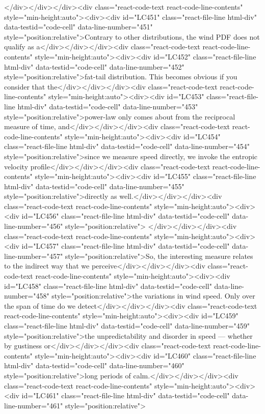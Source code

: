 {{{</div></div></div><div class="react-code-text react-code-line-contents" style="min-height:auto"><div><div id="LC451" class="react-file-line html-div" data-testid="code-cell" data-line-number="451" style="position:relative">Contrary to other distributions, the wind PDF does not qualify as a</div></div></div><div class="react-code-text react-code-line-contents" style="min-height:auto"><div><div id="LC452" class="react-file-line html-div" data-testid="code-cell" data-line-number="452" style="position:relative">fat-tail distribution. This becomes obvious if you consider that the</div></div></div><div class="react-code-text react-code-line-contents" style="min-height:auto"><div><div id="LC453" class="react-file-line html-div" data-testid="code-cell" data-line-number="453" style="position:relative">power-law only comes about from the reciprocal measure of time, and</div></div></div><div class="react-code-text react-code-line-contents" style="min-height:auto"><div><div id="LC454" class="react-file-line html-div" data-testid="code-cell" data-line-number="454" style="position:relative">since we measure speed directly, we invoke the entropic velocity profile</div></div></div><div class="react-code-text react-code-line-contents" style="min-height:auto"><div><div id="LC455" class="react-file-line html-div" data-testid="code-cell" data-line-number="455" style="position:relative">directly as well.</div></div></div><div class="react-code-text react-code-line-contents" style="min-height:auto"><div><div id="LC456" class="react-file-line html-div" data-testid="code-cell" data-line-number="456" style="position:relative">
</div></div></div><div class="react-code-text react-code-line-contents" style="min-height:auto"><div><div id="LC457" class="react-file-line html-div" data-testid="code-cell" data-line-number="457" style="position:relative">So, the interesting measure relates to the indirect way that we perceive</div></div></div><div class="react-code-text react-code-line-contents" style="min-height:auto"><div><div id="LC458" class="react-file-line html-div" data-testid="code-cell" data-line-number="458" style="position:relative">the variations in wind speed. Only over the span of time do we detect</div></div></div><div class="react-code-text react-code-line-contents" style="min-height:auto"><div><div id="LC459" class="react-file-line html-div" data-testid="code-cell" data-line-number="459" style="position:relative">the unpredictability and disorder in speed --- whether by gustiness or</div></div></div><div class="react-code-text react-code-line-contents" style="min-height:auto"><div><div id="LC460" class="react-file-line html-div" data-testid="code-cell" data-line-number="460" style="position:relative">long periods of calm.</div></div></div><div class="react-code-text react-code-line-contents" style="min-height:auto"><div><div id="LC461" class="react-file-line html-div" data-testid="code-cell" data-line-number="461" style="position:relative">
}}}
